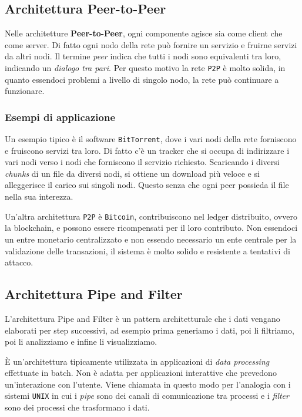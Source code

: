 \subsection{Architettura Peer-to-Peer}
Nelle architetture \textbf{Peer-to-Peer}, ogni componente agisce sia
come client che come server. 
Di fatto ogni nodo della rete può fornire un servizio e fruirne servizi da altri
nodi. Il termine \textit{peer} indica che tutti i nodi sono equivalenti tra loro, 
indicando un \textit{dialogo tra pari}.
Per questo motivo la rete \texttt{P2P} è molto solida, in quanto essendoci problemi 
a livello di singolo nodo, la rete può continuare a funzionare.
\subsubsection{Esempi di applicazione}
Un esempio tipico è il software \texttt{BitTorrent}, dove i vari nodi della rete
forniscono e fruiscono servizi tra loro. Di fatto c'è un tracker che si occupa di
indirizzare i vari nodi verso i nodi che forniscono il servizio richiesto.
Scaricando i diversi \textit{chunks} di un file da diversi nodi, si ottiene un
download più veloce e si alleggerisce il carico sui singoli nodi. Questo 
senza che ogni peer possieda il file nella sua interezza.

Un'altra architettura \texttt{P2P} è \texttt{Bitcoin}, contribuiscono nel 
ledger distribuito, ovvero la blockchain, e possono essere ricompensati per
il loro contributo. Non essendoci un entre monetario centralizzato e non essendo
necessario un ente centrale per la validazione delle transazioni, il sistema
è molto solido e resistente a tentativi di attacco.

\subsection{Architettura Pipe and Filter}
L'architettura Pipe and Filter è un pattern architetturale che i dati 
vengano elaborati per step successivi, ad esempio prima generiamo i dati, poi li
filtriamo, poi li analizziamo e infine li visualizziamo.

È un'architettura tipicamente utilizzata in applicazioni di \textit{data processing} 
effettuate in batch. Non è adatta per applicazioni interattive che prevedono un'interazione
con l'utente.
Viene chiamata in questo modo per l'analogia con i sistemi \texttt{UNIX} in cui i
\textit{pipe} sono dei canali di comunicazione tra processi e i \textit{filter} sono
dei processi che trasformano i dati.

